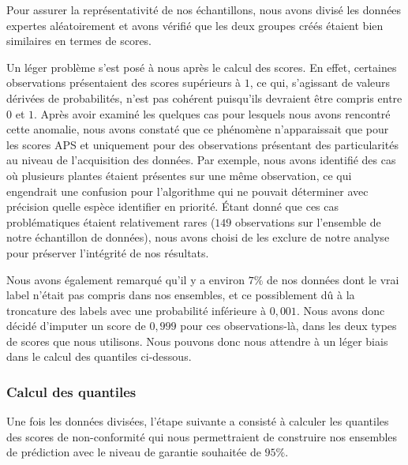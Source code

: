 \documentclass[a4paper,12pt]{article}
\begin{document}
\vspace{0.2cm}

Pour assurer la représentativité de nos échantillons, nous avons divisé les données expertes aléatoirement et avons vérifié que les deux groupes créés étaient bien similaires en termes de scores.

\vspace{0.2cm}

Un léger problème s'est posé à nous après le calcul des scores. En effet, certaines observations présentaient des scores supérieurs à $1$, ce qui, s'agissant de valeurs dérivées de probabilités, n'est pas cohérent puisqu'ils devraient être compris entre $0$ et $1$. Après avoir examiné les quelques cas pour lesquels nous avons rencontré cette anomalie, nous avons constaté que ce phénomène n'apparaissait que pour les scores APS et uniquement pour des observations présentant des particularités au niveau de l'acquisition des données. Par exemple, nous avons identifié des cas où plusieurs plantes étaient présentes sur une même observation, ce qui engendrait une confusion pour l'algorithme qui ne pouvait déterminer avec précision quelle espèce identifier en priorité. Étant donné que ces cas problématiques étaient relativement rares ($149$ observations sur l'ensemble de notre échantillon de données), nous avons choisi de les exclure de notre analyse pour préserver l'intégrité de nos résultats.

\vspace{0.2cm}

Nous avons également remarqué qu'il y a environ $7\%$ de nos données dont le vrai label n'était pas compris dans nos ensembles, et ce possiblement dû à la troncature des labels avec une probabilité inférieure à $0,001$. Nous avons donc décidé d'imputer un score de $0,999$ pour ces observations-là, dans les deux types de scores que nous utilisons. Nous pouvons donc nous attendre à un léger biais dans le calcul des quantiles ci-dessous.

\subsubsection{Calcul des quantiles}

Une fois les données divisées, l'étape suivante a consisté à calculer les quantiles des scores de non-conformité qui nous permettraient de construire nos ensembles de prédiction avec le niveau de garantie souhaitée de $95\%$.

\vspace{3cm}
\end{document}
